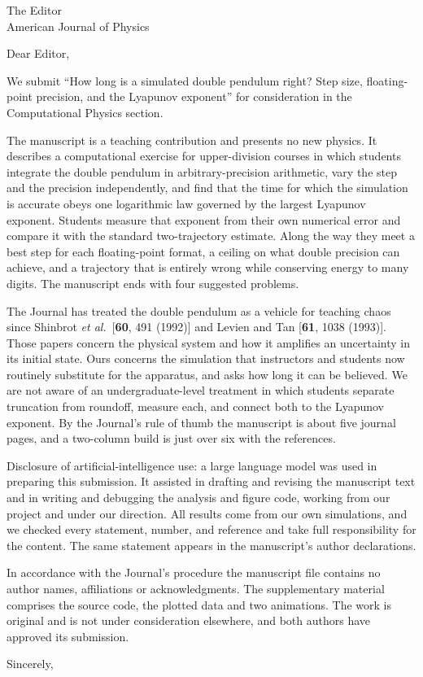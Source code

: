 \documentclass[10pt]{letter}
\begin{document}
\begin{letter}{The Editor\\ American Journal of Physics}
\opening{Dear Editor,}

We submit ``How long is a simulated double pendulum right? Step size,
floating-point precision, and the Lyapunov exponent'' for consideration in the
Computational Physics section.

The manuscript is a teaching contribution and presents no new physics. It
describes a computational exercise for upper-division courses in which students
integrate the double pendulum in arbitrary-precision arithmetic, vary the step
and the precision independently, and find that the time for which the simulation
is accurate obeys one logarithmic law governed by the largest Lyapunov exponent.
Students measure that exponent from their own numerical error and compare it with
the standard two-trajectory estimate. Along the way they meet a best step for each
floating-point format, a ceiling on what double precision can achieve, and a
trajectory that is entirely wrong while conserving energy to many digits. The
manuscript ends with four suggested problems.

The Journal has treated the double pendulum as a vehicle for teaching chaos since
Shinbrot \emph{et al.}\ [\textbf{60}, 491 (1992)] and Levien and Tan
[\textbf{61}, 1038 (1993)]. Those papers concern the physical system and how it
amplifies an uncertainty in its initial state. Ours concerns the simulation that
instructors and students now routinely substitute for the apparatus, and asks how
long it can be believed. We are not aware of an undergraduate-level treatment in
which students separate truncation from roundoff, measure each, and connect both
to the Lyapunov exponent. By the Journal's rule of thumb the manuscript is about
five journal pages, and a two-column build is just over six with the references.

Disclosure of artificial-intelligence use: a large language model was used in
preparing this submission. It assisted in drafting and revising the manuscript
text and in writing and debugging the analysis and figure code, working from
our project and under our direction. All results come from our own
simulations, and we checked every statement, number, and reference and take
full responsibility for the content. The same statement appears in the
manuscript's author declarations.

In accordance with the Journal's procedure the manuscript file contains no author
names, affiliations or acknowledgments. The supplementary material comprises the
source code, the plotted data and two animations. The work is original and is not
under consideration elsewhere, and both authors have approved its submission.

\closing{Sincerely,}
\end{letter}
\end{document}
